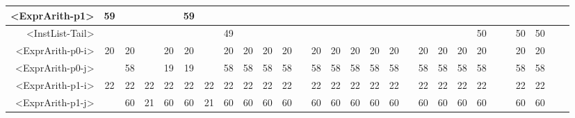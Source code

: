 \begin{tabular}{r|c@{ }c@{ }c@{ }c@{ }c@{ }c@{ }c@{ }c@{ }c@{ }c@{ }c@{ }c@{ }c@{ }c@{ }c@{ }c@{ }c@{ }c@{ }c@{ }c@{ }c@{ }c@{ }c@{ }c@{ }c@{ }c@{ }c@{ }}
<ExprArith-p1> & 59 &   &   &   & 59 &   &   &   &   &   &   &   &   &   &   &   &   &   &   &   &   &   &   &   &   &   &   \\\hline
<InstList-Tail> &   &   &   &   &   &   & 49 &   &   &   &   &   &   &   &   &   &   &   &   &   & 50 &   &   & 50 & 50 &   &   \\\hline
<ExprArith-p0-i> & 20 & 20 &   & 20 & 20 &   & 20 & 20 & 20 & 20 &   & 20 & 20 & 20 & 20 & 20 &   & 20 & 20 & 20 & 20 &   &   & 20 & 20 &   &   \\\hline
<ExprArith-p0-j> &   & 58 &   & 19 & 19 &   & 58 & 58 & 58 & 58 &   & 58 & 58 & 58 & 58 & 58 &   & 58 & 58 & 58 & 58 &   &   & 58 & 58 &   &   \\\hline
<ExprArith-p1-i> & 22 & 22 & 22 & 22 & 22 & 22 & 22 & 22 & 22 & 22 &   & 22 & 22 & 22 & 22 & 22 &   & 22 & 22 & 22 & 22 &   &   & 22 & 22 &   &   \\\hline
<ExprArith-p1-j> &   & 60 & 21 & 60 & 60 & 21 & 60 & 60 & 60 & 60 &   & 60 & 60 & 60 & 60 & 60 &   & 60 & 60 & 60 & 60 &   &   & 60 & 60 &   &   \\\hline
\end{tabular}


